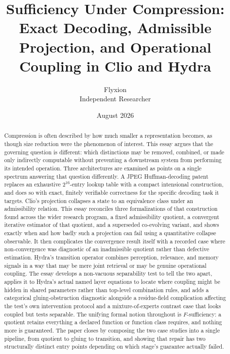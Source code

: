\documentclass[11pt]{article}
\title{\textbf{Sufficiency Under Compression: Exact Decoding, Admissible Projection, and Operational Coupling in Clio and Hydra}}
\author{Flyxion \\ \small Independent Researcher}
\date{August 2026}
\begin{document}
\maketitle

\begin{abstract}
Compression is often described by how much smaller a representation becomes, as though size reduction were the phenomenon of interest. This essay argues that the governing question is different: which distinctions may be removed, combined, or made only indirectly computable without preventing a downstream system from performing its intended operation. Three architectures are examined as points on a single spectrum answering that question differently. A JPEG Huffman-decoding patent replaces an exhaustive $2^{16}$-entry lookup table with a compact intensional construction, and does so with exact, finitely verifiable correctness for the specific decoding task it targets. Clio's projection collapses a state to an equivalence class under an admissibility relation. This essay reconciles three formalizations of that construction found across the wider research program, a fixed admissibility quotient, a convergent iterative estimator of that quotient, and a superseded co-evolving variant, and shows exactly when and how badly such a projection can fail using a quantitative collapse observable. It then complicates the convergence result itself with a recorded case where non-convergence was diagnostic of an inadmissible quotient rather than defective estimation. Hydra's transition operator combines perception, relevance, and memory signals in a way that may be mere joint retrieval or may be genuine operational coupling. The essay develops a non-vacuous separability test to tell the two apart, applies it to Hydra's actual named layer equations to locate where coupling might be hidden in shared parameters rather than top-level combination rules, and adds a categorical gluing-obstruction diagnostic alongside a residue-field complication affecting the test's own intervention protocol and a mixture-of-experts contrast case that looks coupled but tests separable. The unifying formal notion throughout is $F$-sufficiency: a quotient retains everything a declared function or function class requires, and nothing more is guaranteed. The paper closes by composing the two case studies into a single pipeline, from quotient to gluing to transition, and showing that repair has two structurally distinct entry points depending on which stage's guarantee actually failed.
\end{abstract}
\end{document}
